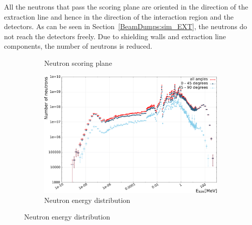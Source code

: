 All the neutrons that pass the scoring plane are oriented in the direction of the extraction line and hence in the direction of the interaction region and the detectors.
As can be seen in Section~\ref{BeamDumps:sim_EXT}, the neutrons do not reach the detectors freely.
Due to shielding walls and extraction line components, the number of neutrons is reduced.
\begin{figure}[hbp]
\centering
  \begin{subfigure}[b]{0.4\textwidth}
   \centering
   \caption{Neutron scoring plane}
   \end{subfigure}
   \hfill
    \begin{subfigure}[b]{0.59\textwidth}
   \centering
    \includegraphics[width=\textwidth]{Figures/BeamDump/Neutron_spectrum_final_BeamDump_hall.png}
   \caption{Neutron energy distribution}
   \end{subfigure}

\end{figure}
